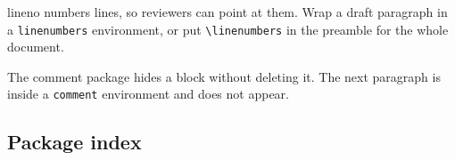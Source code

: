 \begin{linenumbers}
lineno numbers lines, so reviewers can point at them.
Wrap a draft paragraph in a \texttt{linenumbers} environment, or put \texttt{\textbackslash linenumbers} in the preamble for the whole document.
\end{linenumbers}

The comment package hides a block without deleting it. The next paragraph is inside a \texttt{comment} environment and does not appear.

\subsection{Package index}\label{app:latex:index}
